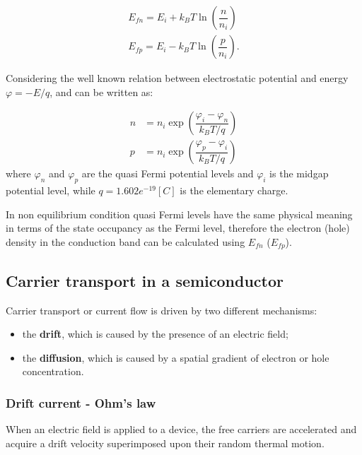 \begin{align}
E_{fn} = E_i + k_B T \ln\left( \dfrac{n}{n_i} \right) \label{eq: quasi fermi level electron} \\
E_{fp} = E_i - k_B T \ln\left( \dfrac{p}{n_i} \right). \label{eq: quasi fermi level hole}
\end{align}


Considering the well known relation between electrostatic potential and energy $\varphi = -E/q$,  and  can be written as:

\begin{align}
n & = n_i \exp\left(\dfrac{\varphi_{i}-\varphi_n}{k_BT/q}\right) \label{eq: non eq n density mb}\\
p & = n_i \exp\left(\dfrac{\varphi_p-\varphi_{i}}{k_BT/q}\right)  \label{eq: non eq p density mb}
\end{align}
where $\varphi_n$ and $\varphi_p$ are the quasi Fermi potential levels and $\varphi_i$ is the midgap potential level, while $q=1.602e^{-19}[C]$ is the elementary charge. 

\begin{Osservazione}
In non equilibrium condition quasi Fermi levels have the same physical meaning in terms of the state occupancy as the Fermi level, therefore the electron (hole) density in the conduction band can be calculated using $E_{fn}$ ($E_{fp}$).
\end{Osservazione}

\subsection{Carrier transport in a semiconductor}
\label{sec: carrier transport}

Carrier transport or current flow is driven by two different mechanisms:
\begin{itemize}
\item the \textbf{drift}, which is caused by the presence of an electric field;
\item the \textbf{diffusion}, which is caused by a spatial gradient of electron or hole concentration.
\end{itemize}

\subsubsection{Drift current - Ohm's law}

When an electric field is applied to a device, the free carriers are accelerated and acquire a drift velocity superimposed upon their random thermal motion.

